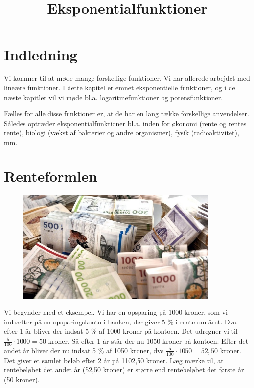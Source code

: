 \documentclass[12pt,oneside,a4paper]{article}
\title{Eksponentialfunktioner}
\date{\vspace{-5ex}}
\theoremstyle{plain}
\begin{document}
\maketitle

\section*{Indledning}
Vi kommer til at møde mange forskellige funktioner. Vi har allerede
arbejdet med lineære funktioner. I dette kapitel er emnet eksponentielle
funktioner, og i de næste kapitler vil vi møde bl.a. logaritmefunktioner og
potensfunktioner.

Fælles for alle disse funktioner er, at de har en lang række forskellige
anvendelser. Således optræder eksponentialfunktioner bl.a. inden for økonomi
(rente og rentes rente), biologi (vækst af bakterier og andre organismer),
fysik (radioaktivitet), mm.

\section*{Renteformlen}
\begin{figure}[ht]
    \centering
    \includegraphics[width=10cm]{penge}
\end{figure}

Vi begynder med et eksempel. Vi har en opsparing på 1000 kroner, som vi
indsætter på en opsparingskonto i banken, der giver 5 \% i rente om året. Dvs.
efter 1 år bliver der indsat 5 \% af 1000 kroner på kontoen. Det
udregner vi til $ \frac{5}{100} \cdot 1000 = 50 $ kroner. Så efter 1 år står
der nu 1050 kroner på kontoen.  Efter det andet år bliver der nu indsat 5 \% af
1050 kroner, dvs $ \frac{5}{100} \cdot 1050 = 52,50$ kroner.
Det giver et samlet beløb efter 2 år på 1102,50 kroner. Læg mærke til, at
rentebeløbet det andet år (52,50 kroner) er større end rentebeløbet det første
år (50 kroner).
\end{document}
